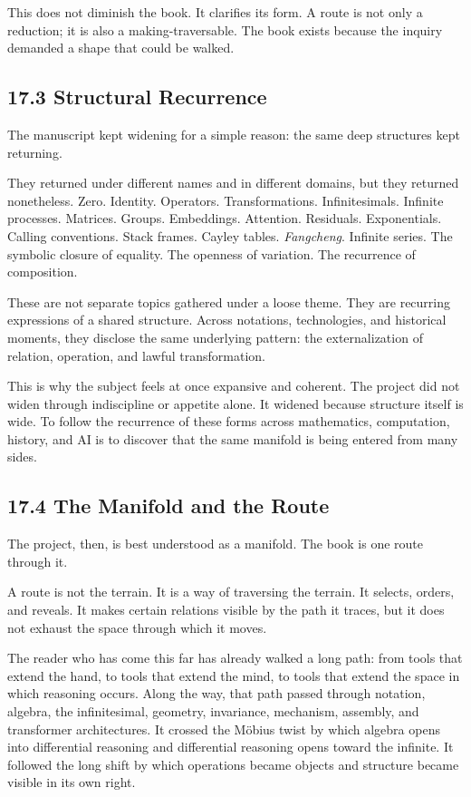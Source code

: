 This does not diminish the book. It clarifies its form. A route is not
only a reduction; it is also a making-traversable. The book exists
because the inquiry demanded a shape that could be walked.

\hypertarget{structural-recurrence}{%
\subsection{17.3 Structural Recurrence}\label{structural-recurrence}}

The manuscript kept widening for a simple reason: the same deep
structures kept returning.

They returned under different names and in different domains, but they
returned nonetheless. Zero. Identity. Operators. Transformations.
Infinitesimals. Infinite processes. Matrices. Groups. Embeddings.
Attention. Residuals. Exponentials. Calling conventions. Stack frames.
Cayley tables. \emph{Fangcheng}. Infinite series. The symbolic closure
of equality. The openness of variation. The recurrence of composition.

These are not separate topics gathered under a loose theme. They are
recurring expressions of a shared structure. Across notations,
technologies, and historical moments, they disclose the same underlying
pattern: the externalization of relation, operation, and lawful
transformation.

This is why the subject feels at once expansive and coherent. The
project did not widen through indiscipline or appetite alone. It widened
because structure itself is wide. To follow the recurrence of these
forms across mathematics, computation, history, and AI is to discover
that the same manifold is being entered from many sides.

\hypertarget{the-manifold-and-the-route}{%
\subsection{17.4 The Manifold and the
Route}\label{the-manifold-and-the-route}}

The project, then, is best understood as a manifold. The book is one
route through it.

A route is not the terrain. It is a way of traversing the terrain. It
selects, orders, and reveals. It makes certain relations visible by the
path it traces, but it does not exhaust the space through which it
moves.

The reader who has come this far has already walked a long path: from
tools that extend the hand, to tools that extend the mind, to tools that
extend the space in which reasoning occurs. Along the way, that path
passed through notation, algebra, the infinitesimal, geometry,
invariance, mechanism, assembly, and transformer architectures. It
crossed the Möbius twist by which algebra opens into differential
reasoning and differential reasoning opens toward the infinite. It
followed the long shift by which operations became objects and structure
became visible in its own right.

